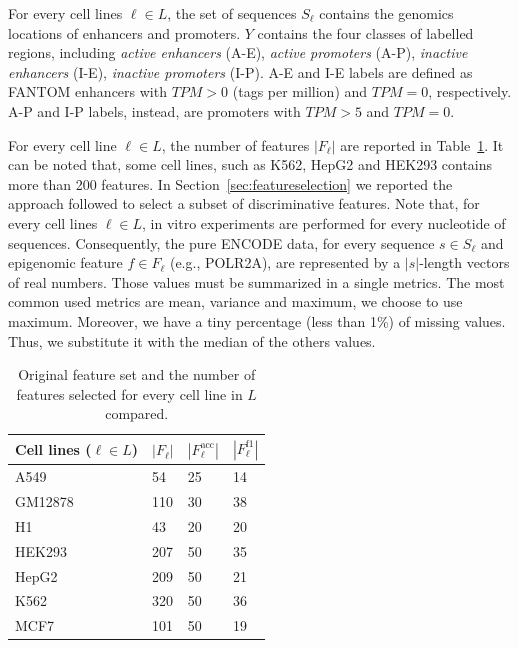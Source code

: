 For every cell lines $\ell \in L$, the set of sequences $S_\ell$ contains the genomics locations of enhancers and promoters. $Y$ contains the four classes of labelled regions, including \emph{active enhancers} (A-E), \emph{active promoters} (A-P), \emph{inactive enhancers} (I-E), \emph{inactive promoters} (I-P). A-E and I-E labels are defined as FANTOM enhancers with $TPM>0$ (tags per million) and $TPM=0$, respectively. A-P and I-P labels, instead, are promoters with $TPM>5$ and $TPM=0$. 

For every cell line $\ell \in L$, the number of features $| F_\ell |$ are reported in Table~\ref{tab:featuressize}. It can be noted that, some cell lines, such as K562, HepG2 and HEK293 contains more than 200 features. In Section~\ref{sec:featureselection} we reported the approach followed to select a subset of discriminative features.
Note that, for every cell lines $\ell \in L$, in vitro experiments are
performed for every nucleotide of sequences. Consequently, the pure ENCODE
data, for every sequence $s \in S_\ell$ and epigenomic feature $f \in
F_\ell$ (e.g., POLR2A), are represented by a $|s|$-length vectors of real
numbers. Those values must be summarized in a single metrics. The most
common used metrics are mean, variance and maximum, we choose to use
maximum. Moreover, we have a tiny percentage (less than 1\%) of
missing values. Thus, we substitute it with the median of the others values.
\begin{table}[t]
\centering
\begin{tabular}{llll}
\toprule
Cell lines ($\ell \in L$) & $|F_\ell|$ & $|F_\ell^{\textrm{acc}}|$ & $|F_\ell^{\textrm{f1}}|$ \\
\midrule
A549               & 54 & 25 & 14                  \\ 
GM12878            & 110 & 30 & 38                 \\ 
H1                 & 43 & 20 & 20                  \\ 
HEK293             & 207 & 50 & 35                 \\ 
HepG2              & 209 & 50 & 21                 \\ 
K562               & 320 & 50 & 36                 \\ 
MCF7               & 101 & 50 & 19                 \\ 
\bottomrule
\end{tabular}
\caption{Original feature set and the number of features selected for every cell line in $L$ compared.}
\label{tab:featuressize}
\end{table}
